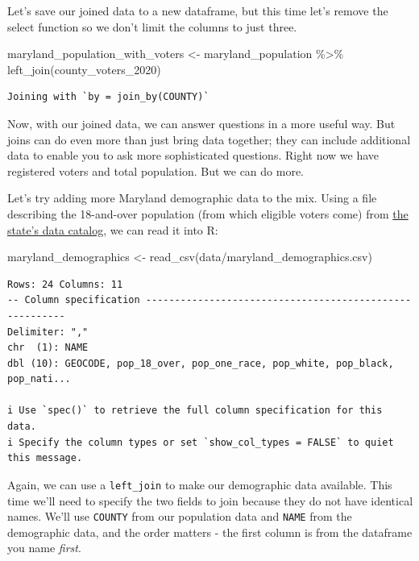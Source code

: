 \documentclass[
  letterpaper,
  DIV=11,
  numbers=noendperiod]{scrreprt}
\newenvironment{Shaded}{\begin{snugshade}}{\end{snugshade}}
\newcommand{\FunctionTok}[1]{\textcolor[rgb]{0.28,0.35,0.67}{#1}}
\newcommand{\NormalTok}[1]{\textcolor[rgb]{0.00,0.23,0.31}{#1}}
\newcommand{\OtherTok}[1]{\textcolor[rgb]{0.00,0.23,0.31}{#1}}
\newcommand{\SpecialCharTok}[1]{\textcolor[rgb]{0.37,0.37,0.37}{#1}}
\newcommand{\StringTok}[1]{\textcolor[rgb]{0.13,0.47,0.30}{#1}}
\begin{document}
Let's save our joined data to a new dataframe, but this time let's
remove the select function so we don't limit the columns to just three.

\begin{Shaded}
\begin{Highlighting}[]
\NormalTok{maryland\_population\_with\_voters }\OtherTok{\textless{}{-}}\NormalTok{ maryland\_population }\SpecialCharTok{\%\textgreater{}\%} \FunctionTok{left\_join}\NormalTok{(county\_voters\_2020)}
\end{Highlighting}
\end{Shaded}

\begin{verbatim}
Joining with `by = join_by(COUNTY)`
\end{verbatim}

Now, with our joined data, we can answer questions in a more useful way.
But joins can do even more than just bring data together; they can
include additional data to enable you to ask more sophisticated
questions. Right now we have registered voters and total population. But
we can do more.

Let's try adding more Maryland demographic data to the mix. Using a file
describing the 18-and-over population (from which eligible voters come)
from
\href{https://planning.maryland.gov/MSDC/Pages/census/Census2020/pL_2020redistricting.aspx}{the
state's data catalog}, we can read it into R:

\begin{Shaded}
\begin{Highlighting}[]
\NormalTok{maryland\_demographics }\OtherTok{\textless{}{-}} \FunctionTok{read\_csv}\NormalTok{(}\StringTok{\textquotesingle{}data/maryland\_demographics.csv\textquotesingle{}}\NormalTok{)}
\end{Highlighting}
\end{Shaded}

\begin{verbatim}
Rows: 24 Columns: 11
-- Column specification --------------------------------------------------------
Delimiter: ","
chr  (1): NAME
dbl (10): GEOCODE, pop_18_over, pop_one_race, pop_white, pop_black, pop_nati...

i Use `spec()` to retrieve the full column specification for this data.
i Specify the column types or set `show_col_types = FALSE` to quiet this message.
\end{verbatim}

Again, we can use a \texttt{left\_join} to make our demographic data
available. This time we'll need to specify the two fields to join
because they do not have identical names. We'll use \texttt{COUNTY} from
our population data and \texttt{NAME} from the demographic data, and the
order matters - the first column is from the dataframe you name
\emph{first}.
\end{document}
